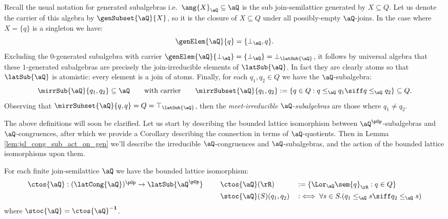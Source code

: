 \documentclass{article}
\begin{document}
\begin{definition}
\begin{enumerate}
Recall the usual notation for generated subalgebras i.e.\ $\ang{X}_\aQ \subseteq \aQ$ is the sub join-semilattice generated by $X \subseteq Q$. Let us denote the carrier of this algebra by $\genSubset{\aQ}{X}$, so it is the closure of $X \subseteq Q$ under all possibly-empty $\aQ$-joins. In the case where $X = \{q\}$ is a singleton we have:
\[
\genElem{\aQ}{q} = \{ \bot_\aQ, q\}.
\]
Excluding the $0$-generated subalgebra with carrier $\genElem{\aQ}{\bot_\aQ} = \{\bot_\aQ\} = \bot_{\latSub{\aQ}}$, it follows by universal algebra that these $1$-generated subalgebras  are precisely the join-irreducible elements of $\latSub{\aQ}$. In fact they are clearly atoms so that $\latSub{\aQ}$ is atomistic: every element is a join of atoms. Finally, for each $q_1,  q_2 \in Q$ we have the $\aQ$-subalgebra:
\[
\mirrSub{\aQ}{q_1,q_2} \subseteq \aQ
\qquad
\text{with carrier}
\qquad
\mirrSubset{\aQ}{q_1,q_2} := \{ q \in Q : q \leq_\aQ q_1 \siff q \leq_\aQ q_2 \} \subseteq Q.
\]
Observing that $\mirrSubset{\aQ}{q,q} = Q = \top_{\latSub{\aQ}}$, then the \emph{meet-irreducible $\aQ$-subalgebras} are those where $q_1 \neq q_2$. \endbox
\end{enumerate}
\end{definition}

\bigskip

The above definitions will soon be clarified. Let us start by describing the bounded lattice isomorphism between $\aQ^{\pOp}$-subalgebras and $\aQ$-congruences, after which we provide a Corollary describing the connection in terms of $\aQ$-quotients. Then in Lemma \ref{lem:jsl_cong_sub_act_on_gen} we'll describe the irreducible $\aQ$-congruences and $\aQ$-subalgebras, and the action of the bounded lattice isomorphisms upon them.

\begin{theorem}
\label{thm:cong_sub_dual_iso}
\item
For each finite join-semilattice $\aQ$ we have the bounded lattice isomorphism:
\[
\begin{tabular}{llll}
$\ctos{\aQ} : (\latCong{\aQ})^{\pOp} \to \latSub{\aQ^{\pOp}}$
&&
$\ctos{\aQ}(\rR)$ & $:= \{ \Lor_\aQ \sem{q}_\rR : q \in Q \}$
\\[1ex]&&
$\stoc{\aQ}(S)(q_1,q_2)$ & $:\iff \forall s \in S.(q_1 \leq_\aQ s \siff q_2 \leq_\aQ s)$ 
\end{tabular}
\]
where $\stoc{\aQ} = \ctos{\aQ}^{\bf-1}$.
\end{theorem}
\end{document}
